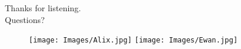 \documentclass{beamer}
\begin{document}
\begin{frame}{}
\begin{center}
\Huge{Thanks for listening. \\
Questions?}
\end{center}
  \begin{figure}[H]
	\centering
	\texttt{[image: Images/Alix.jpg]}
	\texttt{[image: Images/Ewan.jpg]}
	\end{figure}
\end{frame}


\end{document}
